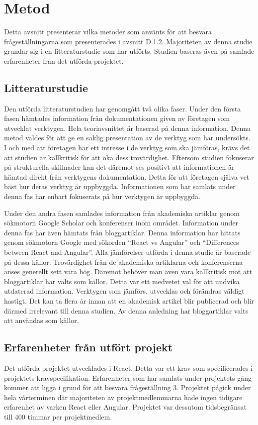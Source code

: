 \section{Metod}
\label{sec:axel-method}

Detta avsnitt presenterar vilka metoder som använts för att besvara frågeställningarna som presenterades i avsnitt D.1.2. Majoriteten av denna studie grundar sig i en litteraturstudie som har utförts. Studien baseras även på samlade erfarenheter från det utförda projektet.

\subsection{Litteraturstudie}
Den utförda litteraturstudien har genomgått två olika faser. Under den första fasen hämtades information från dokumentationen given av företagen som utvecklat verktygen. Hela teoriavsnittet är baserad på denna information. Denna metod valdes för att ge en saklig presentation av de verktyg som har undersökts. I och med att företagen har ett intresse i de verktyg som ska jämföras, krävs det att studien är källkritisk för att öka dess trovärdighet. Eftersom studien fokuserar på strukturella skillnader kan det däremot ses positivt att informationen är hämtad direkt från verktygens dokumentation. Detta för att företagen själva vet bäst hur deras verktyg är uppbyggda. Informationen som har samlats under denna fas har enbart fokuserats på hur verktygen är uppbyggda. 

Under den andra fasen samlades information från akademiska artiklar genom sökmotorn Google Scholar och konferenser inom området. Information under denna fas har även hämtats från bloggartiklar. Denna information har hittats genom sökmotorn Google med sökorden ``React vs Angular'' och ``Differences between React and Angular''. Alla jämförelser utförda i denna studie är baserade på dessa källor. Trovärdighet från de akademiska artiklarna och konferenserna anses generellt sett vara hög. Däremot behöver man även vara källkritisk mot att bloggartiklar har valts som källor. Detta var ett medvetet val för att undvika utdaterad information. Verktygen som jämförs, utvecklas och förändras väldigt hastigt. Det kan ta flera år innan att en akademisk artikel blir publicerad och blir därmed irrelevant till denna studien. Av denna anledning har bloggartiklar valts att användas som källor.

\subsection{Erfarenheter från utfört projekt}
Det utförda projektet utvecklades i React. Detta var ett krav som specificerades i projektets kravspecifikation. Erfarenheter som har samlats under projektets gång kommer att ligga i grund för att besvara frågeställning 3. Projektet pågick under hela vårterminen där majoriteten av projektmedlemmarna hade ingen tidigare erfarenhet av varken React eller Angular. Projektet var dessutom tidsbegränsat till 400 timmar per projektmedlem. 

